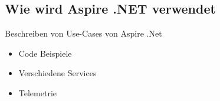     \subsection{Wie wird Aspire .NET verwendet}
        Beschreiben von Use-Cases von Aspire .Net

        \begin{itemize}
            \item Code Beispiele
            \item Verschiedene Services
            \item Telemetrie
        \end{itemize}
